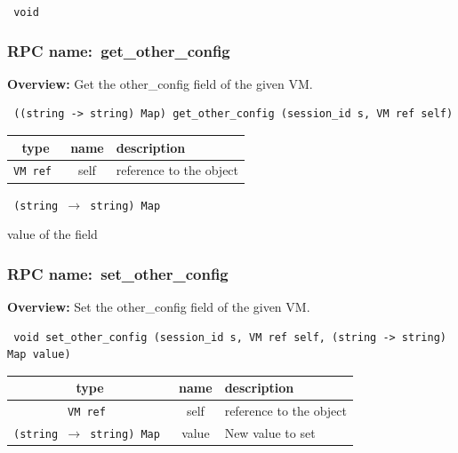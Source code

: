 \vspace{0.3cm}

{\tt 
void
}



\vspace{0.3cm}
\vspace{0.3cm}
\vspace{0.3cm}
\subsubsection{RPC name:~get\_other\_config}

{\bf Overview:} 
Get the other\_config field of the given VM.

\begin{verbatim} ((string -> string) Map) get_other_config (session_id s, VM ref self)\end{verbatim}



 
\vspace{0.3cm}
\begin{tabular}{|c|c|p{7cm}|}
 \hline
{\bf type} & {\bf name} & {\bf description} \\ \hline
{\tt VM ref } & self & reference to the object \\ \hline 

\end{tabular}

\vspace{0.3cm}

{\tt 
(string $\rightarrow$ string) Map
}


value of the field
\vspace{0.3cm}
\vspace{0.3cm}
\vspace{0.3cm}
\subsubsection{RPC name:~set\_other\_config}

{\bf Overview:} 
Set the other\_config field of the given VM.

\begin{verbatim} void set_other_config (session_id s, VM ref self, (string -> string) Map value)\end{verbatim}



 
\vspace{0.3cm}
\begin{tabular}{|c|c|p{7cm}|}
 \hline
{\bf type} & {\bf name} & {\bf description} \\ \hline
{\tt VM ref } & self & reference to the object \\ \hline 

{\tt (string $\rightarrow$ string) Map } & value & New value to set \\ \hline 

\end{tabular}

